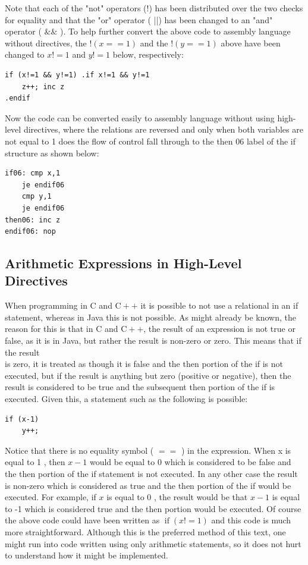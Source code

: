 \documentclass[10pt]{book}
\begin{document}
Note that each of the "not" operators (!) has been distributed over the two checks for equality and that the "or" operator ( ||) has been changed to an "and" operator ( $\& \&$ ). To help further convert the above code to assembly language without directives, the $!(x==1)$ and the $!(y==1)$ above have been changed to $x!=1$ and $y!=1$ below, respectively:

\begin{verbatim}
if (x!=1 && y!=1) .if x!=1 && y!=1
    z++; inc z
.endif
\end{verbatim}

Now the code can be converted easily to assembly language without using high-level directives, where the relations are reversed and only when both variables are not equal to 1 does the flow of control fall through to the then 06 label of the if structure as shown below:

\begin{verbatim}
if06: cmp x,1
    je endif06
    cmp y,1
    je endif06
then06: inc z
endif06: nop
\end{verbatim}

\subsection{Arithmetic Expressions in High-Level Directives}
When programming in C and $\mathrm{C}++$ it is possible to not use a relational in an if statement, whereas in Java this is not possible. As might already be known, the reason for this is that in C and $\mathrm{C}++$, the result of an expression is not true or false, as it is in Java, but rather the result is non-zero or zero. This means that if the result\\
is zero, it is treated as though it is false and the then portion of the if is not executed, but if the result is anything but zero (positive or negative), then the result is considered to be true and the subsequent then portion of the if is executed. Given this, a statement such as the following is possible:


\begin{verbatim}
if (x-1)
    y++;
\end{verbatim}

Notice that there is no equality symbol ( $==$ ) in the expression. When x is equal to 1 , then $x-1$ would be equal to 0 which is considered to be false and the then portion of the if statement is not executed. In any other case the result is non-zero which is considered as true and the then portion of the if would be executed. For example, if $x$ is equal to 0 , the result would be that $x-1$ is equal to -1 which is considered true and the then portion would be executed. Of course the above code could have been written as $\operatorname{if}(x!=1)$ and this code is much more straightforward. Although this is the preferred method of this text, one might run into code written using only arithmetic statements, so it does not hurt to understand how it might be implemented.
\end{document}
